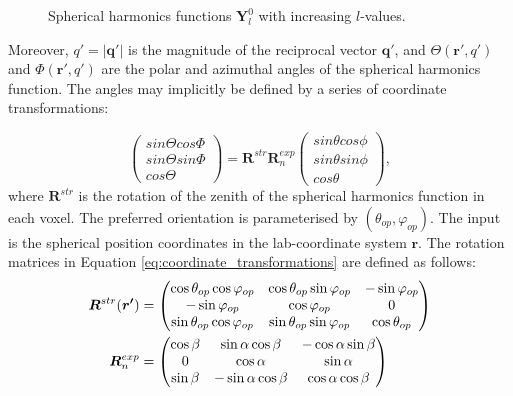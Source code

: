 \begin{figure}[h!]
    \centering
    
    \caption{Spherical harmonics functions $\bm{Y}_{l}^{0}$ with increasing $l$-values.}
    \label{fig:spherical_harmonics}
\end{figure}


Moreover, $q' = |\bm{q'}|$ is the magnitude of the reciprocal vector $\bm{q'}$, and $\Theta(\bm{r'}, q')$ and $\Phi(\bm{r'}, q')$ are the polar and azimuthal angles of the spherical harmonics function.
The angles may implicitly be defined by a series of coordinate transformations:

\begin{equation}\label{eq:coordinate_transformations}
    \begin{pmatrix}
        sin \Theta cos \Phi \\
        sin \Theta sin \Phi \\
        cos \Theta
    \end{pmatrix}
    = \bm{R}^{str} \bm{R}_{n}^{exp}
    \begin{pmatrix}
        sin \theta cos \phi \\
        sin \theta sin \phi \\
        cos \theta
    \end{pmatrix},
\end{equation}
\noindent
where $\bm{R}^{str}$ is the rotation of the zenith of the spherical harmonics function in each voxel. The preferred orientation is parameterised by $(\theta_{op}, \varphi_{op})$.
The input is the spherical position coordinates in the lab-coordinate system $\bm{r}$.
The rotation matrices in Equation \eqref{eq:coordinate_transformations} are defined as follows:
\begin{equation}
    \begin{split}
        \bm{R}^{str}(\bm{r'}) &=
        \begin{pmatrix}
            \cos\theta_{op} \cos\varphi_{op} & \cos\theta_{op} \sin\varphi_{op} & -\sin\varphi_{op}  \\
            -\sin\varphi_{op}            & \cos\varphi_{op}             & 0           \\
            \sin\theta_{op} \cos\varphi_{op} & \sin\theta_{op} \sin\varphi_{op} & \cos\theta_{op}
        \end{pmatrix}\\
        \bm{R}_{n}^{exp} &=
        \begin{pmatrix}
            \cos \beta & \sin \alpha \cos \beta & -\cos\alpha \sin\beta \\
            0          & \cos \alpha            & \sin \alpha           \\
            \sin\beta  & - \sin\alpha \cos\beta & \cos\alpha \cos\beta
        \end{pmatrix}
    \end{split}
\end{equation}

